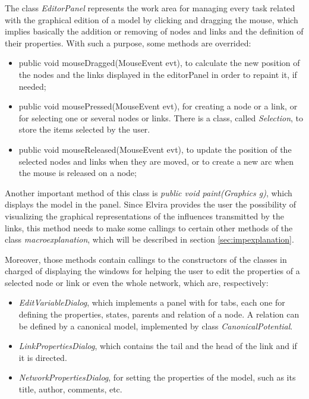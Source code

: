 The class \emph{EditorPanel} represents the work area for managing
every task related with the graphical edition of a model by
clicking and dragging the mouse, which implies basically the
addition or removing of nodes and links and the definition of
their properties. With such a purpose, some methods are overrided:
\begin{itemize}
\item public void mouseDragged(MouseEvent evt), to calculate the
new position of the nodes and the links displayed in the
editorPanel in order to repaint it, if needed;
\item public void mousePressed(MouseEvent evt), for creating a node
or a link, or for selecting one or several nodes or links. There
is a class, called \emph{Selection}, to store the items selected
by the user.
\item public void mouseReleased(MouseEvent evt), to update the position of
the selected nodes and links when they are moved, or to create a
new arc when the mouse is released on a node;
\end{itemize}
Another important method of this class is \emph{public void
paint(Graphics g)}, which displays the model in the panel. Since
Elvira provides the user the possibility of visualizing the
graphical representations of the influences transmitted by the
links, this method needs to make some callings to certain other
methods of the class \emph{macroexplanation}, which will be
described in section \ref{sec:impexplanation}.

Moreover, those methods contain callings to the constructors of
the classes in charged of displaying the windows for helping the
user to edit the properties of a selected node or link or even the
whole network, which are, respectively:
\begin{itemize}
  \item \emph{EditVariableDialog}, which implements a panel with for tabs, each one for
  defining the properties, states, parents and relation of a node. A relation can be defined by a canonical model,
  implemented by class \emph{CanonicalPotential}.
  \item \emph{LinkPropertiesDialog}, which contains the tail and
  the head of the link and if it is directed.
  \item \emph{NetworkPropertiesDialog}, for setting the properties of the model, such as its title, author, comments, etc.
\end{itemize}


